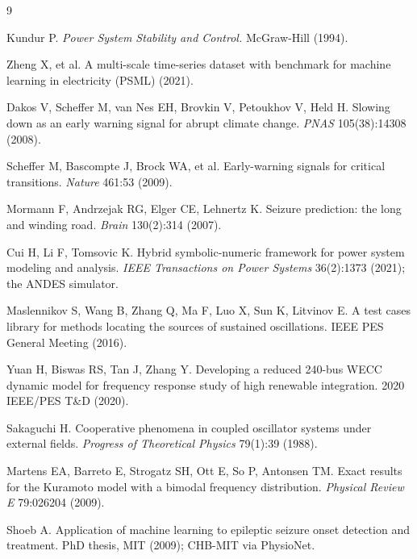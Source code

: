 \documentclass[11pt]{article}
\begin{document}
\begin{thebibliography}{9}

 Kundur P. \emph{Power System Stability and
Control.} McGraw-Hill (1994).

 Zheng X, et al. A multi-scale time-series dataset
with benchmark for machine learning in electricity (PSML) (2021).

 Dakos V, Scheffer M, van Nes EH, Brovkin V,
Petoukhov V, Held H. Slowing down as an early warning signal for abrupt
climate change. \emph{PNAS} 105(38):14308 (2008).

 Scheffer M, Bascompte J, Brock WA, et al.
Early-warning signals for critical transitions. \emph{Nature} 461:53
(2009).

 Mormann F, Andrzejak RG, Elger CE, Lehnertz K.
Seizure prediction: the long and winding road. \emph{Brain} 130(2):314
(2007).

 Cui H, Li F, Tomsovic K. Hybrid symbolic-numeric
framework for power system modeling and analysis. \emph{IEEE
Transactions on Power Systems} 36(2):1373 (2021); the ANDES simulator.

 Maslennikov S, Wang B, Zhang Q, Ma F, Luo X,
Sun K, Litvinov E. A test cases library for methods locating the
sources of sustained oscillations. IEEE PES General Meeting (2016).

 Yuan H, Biswas RS, Tan J, Zhang Y. Developing a
reduced 240-bus WECC dynamic model for frequency response study of high
renewable integration. 2020 IEEE/PES T\&D (2020).

 Sakaguchi H. Cooperative phenomena in coupled
oscillator systems under external fields. \emph{Progress of
Theoretical Physics} 79(1):39 (1988).

 Martens EA, Barreto E, Strogatz SH, Ott E, So P,
Antonsen TM. Exact results for the Kuramoto model with a bimodal
frequency distribution. \emph{Physical Review E} 79:026204 (2009).

 Shoeb A. Application of machine learning to
epileptic seizure onset detection and treatment. PhD thesis, MIT
(2009); CHB-MIT via PhysioNet.

\end{thebibliography}
\end{document}
